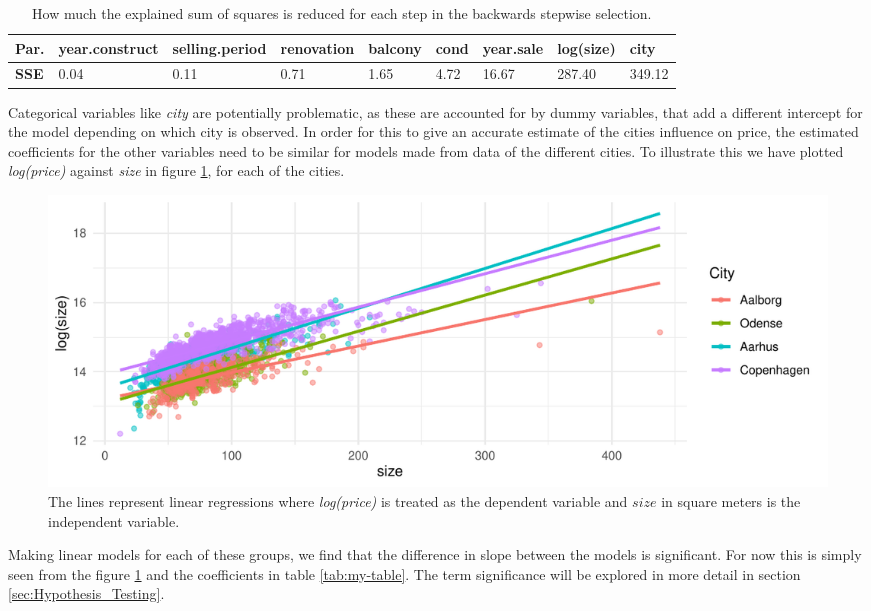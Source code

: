 \begin{table}[H] 
\begin{tabular}{@{}lllllllll@{}}
\toprule
\textbf{Par.} & year.construct & selling.period & renovation & balcony & cond & year.sale & log(size) & city   \\ \midrule
\textbf{SSE} & 0.04           & 0.11           & 0.71       & 1.65    &   4.72   & 16.67     & 287.40    & 349.12 \\ \bottomrule
\end{tabular}
\caption{How much the explained sum of squares is reduced for each step in the backwards stepwise selection.}
\label{tbl:Parameter_SSE}
\end{table}
Categorical variables like \textit{city} are potentially problematic, as these are accounted for by dummy variables, that add a different intercept for the model depending on which city is observed.
In order for this to give an accurate estimate of the cities influence on price, the estimated coefficients for the other variables need to be similar for models made from data of the different cities. 
To illustrate this we have plotted \textit{log(price)} against \textit{size} in figure \ref{fig:Forskellig_haeldning}, for each of the cities.
\begin{figure}[H]
    \centering
    \includegraphics[width = 1\textwidth]{figures/Nanna/Forskellig_haeldning.pdf}
    \caption{The lines represent linear regressions where \textit{log(price)} is treated as the dependent variable and $size$ in square meters is the independent variable.}
    \label{fig:Forskellig_haeldning}
\end{figure}
Making linear models for each of these groups, we find that the difference in slope between the models is significant.
For now this is simply seen from the figure \ref{fig:Forskellig_haeldning} and the coefficients in table \ref{tab:my-table}.
The term significance will be explored in more detail in section \ref{sec:Hypothesis_Testing}. 


